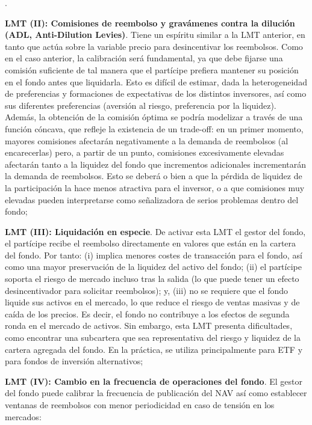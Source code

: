 \documentclass[10pt,a4paper]{article}
\newcounter{numitem}
\newenvironment{lnum}
      {\begin{list}{\arabic{numitem}.}{%
          \usecounter{numitem}%
          \setlength{\leftmargin}{1cm}%
          \setlength{\parskip}{3pt}%
          \setlength{\itemsep}{0pt}%
          \setlength{\parsep}{0pt}%
      }}
      {\end{list}}
\begin{document}
\begin{lnum}
    \item \textbf{LMT (II): Comisiones de reembolso y gravámenes contra la dilución (ADL, Anti-Dilution Levies)}. Tiene un espíritu similar a la LMT anterior, en tanto que actúa sobre la variable precio para desincentivar los reembolsos. Como en el caso anterior, la calibración será fundamental, ya que debe fijarse una comisión suficiente de tal manera que el partícipe prefiera mantener su posición en el fondo antes que liquidarla. Esto es difícil de estimar, dada la heterogeneidad de preferencias y formaciones de expectativas de los distintos inversores, así como sus diferentes preferencias (aversión al riesgo, preferencia por la liquidez). Además, la obtención de la comisión óptima se podría modelizar a través de una función cóncava, que refleje la existencia de un trade-off: en un primer momento, mayores comisiones afectarán negativamente a la demanda de reembolsos (al encarecerlas) pero, a partir de un punto, comisiones excesivamente elevadas afectarán tanto a la liquidez del fondo que incrementos adicionales incrementarán la demanda de reembolsos. Esto se deberá o bien a que la pérdida de liquidez de la participación la hace menos atractiva para el inversor, o a que comisiones muy elevadas pueden interpretarse como señalizadora de serios problemas dentro del fondo;
    \item \textbf{LMT (III): Liquidación en especie}. De activar esta LMT el gestor del fondo, el partícipe recibe el reembolso directamente en valores que están en la cartera del fondo. Por tanto: (i) implica menores costes de transacción para el fondo, así como una mayor preservación de la liquidez del activo del fondo; (ii) el partícipe soporta el riesgo de mercado incluso tras la salida (lo que puede tener un efecto desincentivador para solicitar reembolsos); y, (iii) no se requiere que el fondo liquide sus activos en el mercado, lo que reduce el riesgo de ventas masivas y de caída de los precios. Es decir, el fondo no contribuye a los efectos de segunda ronda en el mercado de activos. Sin embargo, esta LMT presenta dificultades, como encontrar una subcartera que sea representativa del riesgo y liquidez de la cartera agregada del fondo. En la práctica, se utiliza principalmente para ETF y para fondos de inversión alternativos;
    \item \textbf{LMT (IV): Cambio en la frecuencia de operaciones del fondo}. El gestor del fondo puede calibrar la frecuencia de publicación del NAV así como establecer ventanas de reembolsos con menor periodicidad en caso de tensión en los mercados:

\end{lnum}
\end{document}
